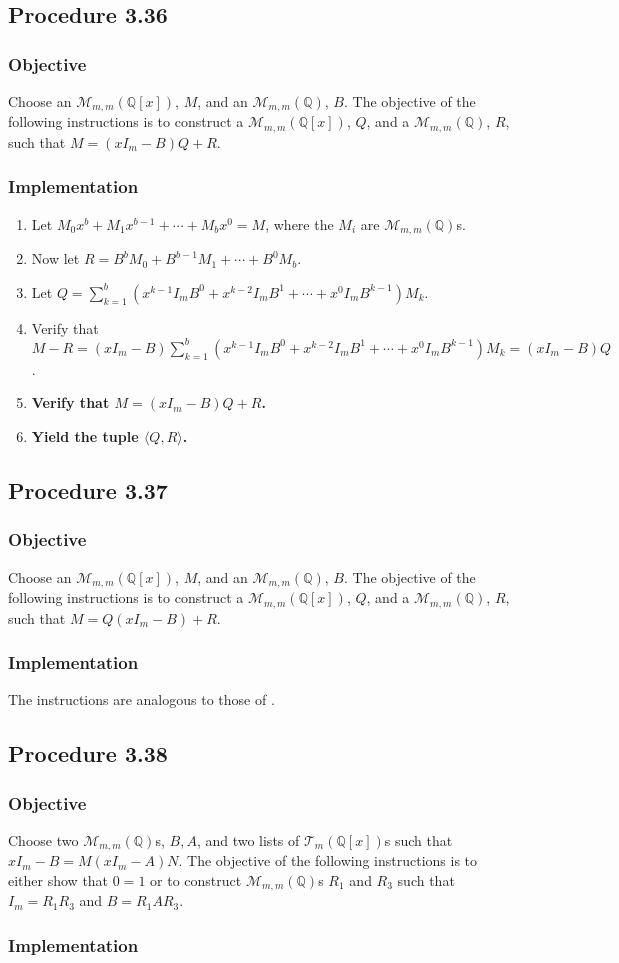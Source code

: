 \documentclass[twocolumn]{article}
\newcommand{\procedure}[2][]{\subsection*{Procedure #2 \ifthenelse{\equal{#1}{}}{}{(#1)}}\label{sec:procedure #2}}
\newcommand{\objective}{\subsubsection*{Objective}}
\newcommand{\implementation}{\subsubsection*{Implementation}}
\newcommand{\procedurehr}[2][]{\hyperref[sec:procedure #2]{\ifthenelse{\equal{#1}{}}{procedure #2}{#1}}}
\begin{document}
		\procedure{3.36}
			\objective
				Choose an $\mathcal{M}_{m,m}(\mathbb{Q}[x])$, $M$, and an $\mathcal{M}_{m,m}(\mathbb{Q})$, $B$. The objective of the following instructions is to construct a $\mathcal{M}_{m,m}(\mathbb{Q}[x])$, $Q$, and a $\mathcal{M}_{m,m}(\mathbb{Q})$, $R$, such that $M=(xI_m-B)Q+R$.
			\implementation
				\begin{enumerate}
					\item Let $M_0x^b+M_1x^{b-1}+\cdots+M_bx^0=M$, where the $M_i$ are $\mathcal{M}_{m,m}(\mathbb{Q})$s.
					\item Now let $R=B^bM_0+B^{b-1}M_1+\cdots+B^0M_b$.
					\item Let $Q=\sum_{k=1}^b (x^{k-1}I_mB^0+x^{k-2}I_mB^1+\cdots+x^0I_mB^{k-1})M_k$.
					\item Verify that $M-R=(xI_m-B)\sum_{k=1}^b (x^{k-1}I_mB^0+x^{k-2}I_mB^1+\cdots+x^0I_mB^{k-1})M_k=(xI_m-B)Q$.
					\item \textbf{Verify that $M=(xI_m-B)Q+R$.}
					\item \textbf{Yield the tuple $\langle Q,R\rangle$.}
				\end{enumerate}
		\procedure{3.37}
			\objective
				Choose an $\mathcal{M}_{m,m}(\mathbb{Q}[x])$, $M$, and an $\mathcal{M}_{m,m}(\mathbb{Q})$, $B$. The objective of the following instructions is to construct a $\mathcal{M}_{m,m}(\mathbb{Q}[x])$, $Q$, and a $\mathcal{M}_{m,m}(\mathbb{Q})$, $R$, such that $M=Q(xI_m-B)+R$.
			\implementation
				The instructions are analogous to those of \procedurehr{3.36}.
		\procedure{3.38}
			\objective
				Choose two $\mathcal{M}_{m,m}(\mathbb{Q})$s, $B,A$, and two lists of $\mathcal{T}_{m}(\mathbb{Q}[x])$s such that $xI_m-B=M(xI_m-A)N$. The objective of the following instructions is to either show that $0=1$ or to construct $\mathcal{M}_{m,m}(\mathbb{Q})$s $R_1$ and $R_3$ such that $I_m=R_1R_3$ and $B=R_1AR_3$.
			\implementation
\end{document}
